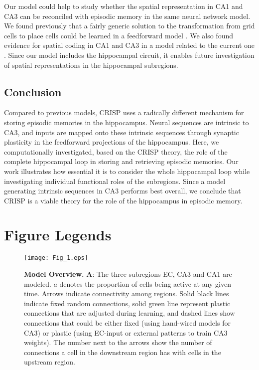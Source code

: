 \documentclass[utf8]{frontiersSCNS} %
\begin{document}
Our model could help to study whether the spatial representation in CA1 and CA3 can be reconciled with episodic memory in the same neural network model. We found previously that a fairly generic solution to the transformation from grid cells to place cells could be learned in a feedforward model \cite{cheng2011structure}. We also found evidence for spatial coding in CA1 and CA3 in a model related to the current one \cite{neher2015memory}. Since our model includes the hippocampal circuit, it enables future investigation of spatial representations in the hippocampal subregions. 


\subsection{Conclusion} 
Compared to previous models, CRISP uses a radically different mechanism for storing episodic memories in the hippocampus. Neural sequences are intrinsic to CA3, and inputs are mapped onto these intrinsic sequences through synaptic plasticity in the feedforward projections of the hippocampus. Here, we computationally investigated, based on the CRISP theory, the role of the complete hippocampal loop in storing and retrieving episodic memories. Our work illustrates how essential it is to consider the whole hippocampal loop while investigating individual functional roles of the subregions. Since a model generating intrinsic sequences in CA3 performs best overall, we conclude that CRISP is a viable theory for the role of the hippocampus in episodic memory.







\section*{Figure Legends}

\begin{figure}[!htb]
\centering\texttt{[image: Fig\_1.eps]}
\caption{\textbf{Model Overview.} \textbf A: The three subregions EC, CA3 and CA1 are modeled. $a$ denotes the proportion of cells being active at any given time. Arrows indicate connectivity among regions. Solid black lines indicate fixed random connections, solid green line represent plastic connections that are adjusted during learning, and dashed lines show connections that could be either fixed (using hand-wired models for CA3) or plastic (using EC-input or external patterns to train CA3 weights). The number next to the arrows show the number of connections a cell in the downstream region has with cells in the upstream region.}
\label{Fig_1}
\end{figure}
\end{document}
